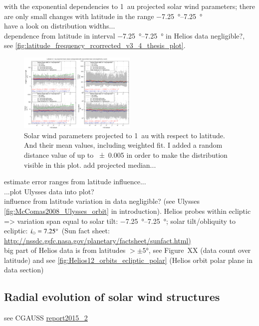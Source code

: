 with the exponential dependencies to 1~au projected solar wind parameters; there are only small changes with latitude in the range \SIrange{-7.25}{7.25}{\degree}\\
have a look on distribution widths...\\

dependence from latitude in interval \SIrange{-7.25}{7.25}{\degree} in Helios data negligible?, see \autoref{fig:latitude_frequency_rcorrected_v3_4_thesis_plot}.\\
\begin{figure}[htb]
	\centering
	\includegraphics[width=0.5\textwidth]{figures_of_mine/gnuplots/latitude_frequency_rcorrected_v3_4_thesis_plot.png}
	\caption{Solar wind parameters projected to 1~au with respect to latitude. And their mean values, including weighted fit. I added a random distance value of up to \SI{+-0.005}{\au} in order to make the distribution visible in this plot. add projected median...}
	\label{fig:latitude_frequency_rcorrected_v3_4_thesis_plot}
\end{figure}
estimate error ranges from latitude influence...\\

...plot Ulysses data into plot?\\

influence from latitude variation in data negligible? (see Ulysses \autoref{fig:McComas2008_Ulysses_orbit} in introduction). Helios probes within ecliptic => variation span equal to solar tilt: \SIrange{-7.25}{7.25}{\degree}; solar tilt/obliquity to ecliptic: $i_\odot = 7.25\degree$ (Sun fact sheet: \url{http://nssdc.gsfc.nasa.gov/planetary/factsheet/sunfact.html)}\\
big part of Helios data is from latitudes $>\pm5$°, see Figure~XX (data count over latitude) and see \autoref{fig:Helios12_orbits_ecliptic_polar} (Helios orbit polar plane in data section)\\


\subsection{Radial evolution of solar wind structures}
see CGAUSS \url{report2015_2}

